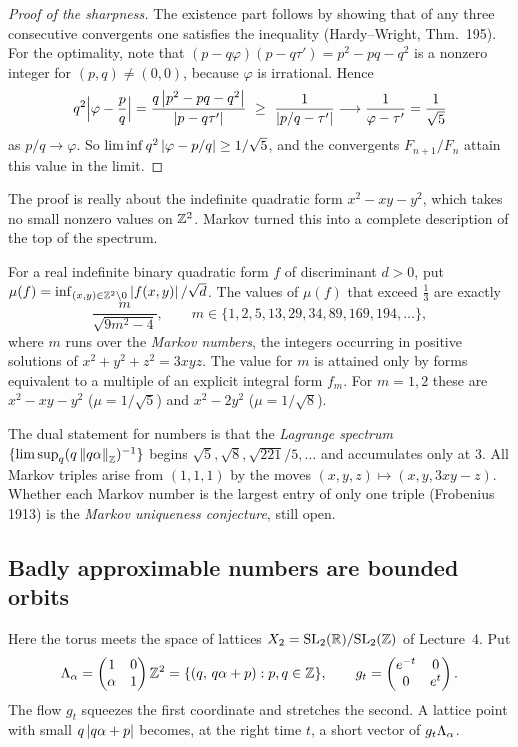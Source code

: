 \begin{proof}[Proof of the sharpness]
The existence part follows by showing that of any three consecutive convergents one satisfies the
inequality (Hardy--Wright, Thm.~195). For the optimality, note that
$(p-q\varphi)(p-q\tau')=p^2-pq-q^2$ is a nonzero integer for $(p,q)\neq(0,0)$, because $\varphi$ is
irrational. Hence
\[
  q^2\Big|\varphi-\frac pq\Big|=\frac{q\abs{p^2-pq-q^2}}{\abs{p-q\tau'}}\ \ge\ \frac{1}{\abs{p/q-\tau'}}
  \longrightarrow\frac1{\varphi-\tau'}=\frac1{\sqrt5}
\]
as $p/q\to\varphi$. So $\liminf q^2\left\lvert \varphi-p/q \right\rvert\ge1/\sqrt5$, and the convergents
$F_{n+1}/F_n$ attain this value in the limit.
\end{proof}

The proof is really about the indefinite quadratic form $x^2-xy-y^2$, which takes no small nonzero
values on $\mathbb{Z}^2$. Markov turned this into a complete description of the top of the spectrum.

\begin{theorem}[Markov 1879--80]\label{ERG:thm:markov}
For a real indefinite binary quadratic form $f$ of discriminant $d>0$, put
$\mu(f)=\inf_{(x,y)\in\mathbb{Z}^2\setminus0}\left\lvert f(x,y) \right\rvert/\sqrt d$. The values of $\mu(f)$ that exceed $\frac13$
are exactly
\[
  \frac{m}{\sqrt{9m^2-4}},\qquad m\in\{1,2,5,13,29,34,89,169,194,\dots\},
\]
where $m$ runs over the \emph{Markov numbers}, the integers occurring in positive solutions of
$x^2+y^2+z^2=3xyz$. The value for $m$ is attained only by forms equivalent to a multiple of an
explicit integral form $f_m$. For $m=1,2$ these are $x^2-xy-y^2$ ($\mu=1/\sqrt5$) and $x^2-2y^2$
($\mu=1/\sqrt8$).
\end{theorem}

The dual statement for numbers is that the \emph{Lagrange spectrum}
$\{\limsup_q(q\left\lVert q\alpha \right\rVert_{\mathbb{Z}})^{-1}\}$ begins $\sqrt5,\sqrt8,\sqrt{221}/5,\dots$ and accumulates
only at $3$. All Markov triples arise from $(1,1,1)$ by the moves $(x,y,z)\mapsto(x,y,3xy-z)$. Whether
each Markov number is the largest entry of only one triple (Frobenius 1913) is the \emph{Markov
uniqueness conjecture}, still open.

\subsection*{Badly approximable numbers are bounded orbits}

Here the torus meets the space of lattices $X_2=\mathrm{SL}_2(\mathbb{R})/\mathrm{SL}_2(\mathbb{Z})$ of Lecture~4. Put
\[
  \Lambda_\alpha=\begin{pmatrix}1&0\\ \alpha&1\end{pmatrix}\mathbb{Z}^2=\{(q,\,q\alpha+p):p,q\in\mathbb{Z}\},
  \qquad g_t=\begin{pmatrix}e^{-t}&0\\0&e^{t}\end{pmatrix}.
\]
The flow $g_t$ squeezes the first coordinate and stretches the second. A lattice point with small
$q\left\lvert q\alpha+p \right\rvert$ becomes, at the right time $t$, a short vector of $g_t\Lambda_\alpha$.

